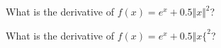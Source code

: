 \documentclass{amsart}
\begin{document}
\begin{category} %
\begin{question}[essay]
What is the derivative of $f(x) = e^x + 0.5 \Vert x \Vert^2$?
\end{question}
\begin{question}[essay]
What is the derivative of $f(x) = e^x + 0.5 \Vert x \{^2$?
\end{question}
\end{category}
\end{document}
